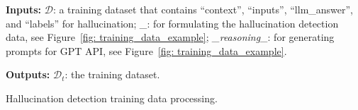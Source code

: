 
\begin{algorithm}[!t]
\textbf{Inputs:} 
$\mathcal{D}$: a training dataset that contains ``context'', ``inputs'', ``llm\_answer'', and ``labels'' for hallucination; %
\textit{\_}: for formulating the hallucination detection data, see Figure~\ref{fig: training_data_example}; \textit{\_\textit{reasoning}\_}: for generating prompts for GPT API, see Figure~\ref{fig: training_data_example}.

\textbf{Outputs:} $\mathcal{D}_t$: the training dataset.


 

\caption{Hallucination detection training data processing.}
\label{alg:hallucination_data_processing}
\end{algorithm}
